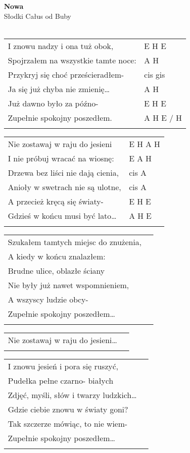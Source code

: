 \documentclass[a5paper]{article}
\begin{document}


\noindent
\fontsize{12pt}{15pt}\selectfont
\textbf{Nowa} \\
\fontsize{8pt}{10pt}\selectfont
Słodki Całus od Buby \\ \\
\fontsize{10pt}{12pt}\selectfont
{}
\begin{tabular}{@{}p{8.00cm}p{3cm}@{}}
\noindent
I znowu nadzy i ona tuż obok, & E H E \\
Spojrzałem na wszystkie tamte noce: & A H \\
Przykryj się choć prześcieradłem- & cis gis \\
Ja się już chyba nie zmienię… & A H \\
Już dawno było za późno- & E H E \\
Zupełnie spokojny poszedłem. & A H E / H \\ \\
\end{tabular}

\noindent
\begin{tabular}{@{}p{7.00cm}p{3cm}@{}}
Nie zostawaj w raju do jesieni & E H A H \\
I nie próbuj wracać na wiosnę: & E A H \\
Drzewa bez liści nie dają cienia, & cis A \\
Anioły w swetrach nie są ulotne, & cis A \\
A przecież kręcą się światy- & E H E \\
Gdzieś w końcu musi być lato… & A H E \\ \\
\end{tabular}

\noindent
\begin{tabular}{@{}p{7.00cm}p{3cm}@{}}
Szukałem tamtych miejsc do znużenia, \\
A kiedy w końcu znalazłem:\\
Brudne ulice, oblazłe ściany\\ 
Nie były już nawet wspomnieniem,  \\
A wszyscy ludzie obcy- \\
Zupełnie spokojny poszedłem… \\ \\
\end{tabular}

\noindent
\begin{tabular}{@{}p{7.00cm}p{3cm}@{}}
Nie zostawaj w raju do jesieni… \\ \\
\end{tabular}

\noindent
\begin{tabular}{@{}p{7.00cm}p{3cm}@{}}
I znowu jesień i pora się ruszyć, \\
Pudełka pełne czarno- białych \\
Zdjęć, myśli, słów i twarzy ludzkich… \\
Gdzie ciebie znowu w światy goni? \\
Tak szczerze mówiąc, to nie wiem- \\
Zupełnie spokojny poszedłem… \\ \\
\end{tabular}
\end{document}
